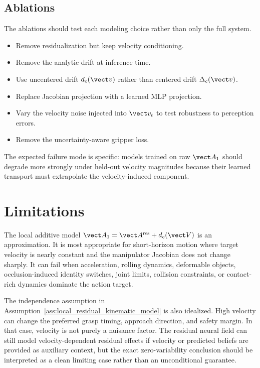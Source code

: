 \documentclass{article} %
\begin{document}
\subsection{Ablations}

The ablations should test each modeling choice rather than only the full system.
\begin{itemize}
    \item Remove residualization but keep velocity conditioning.
    \item Remove the analytic drift at inference time.
    \item Use uncentered drift $d_c(\vect v)$ rather than centered drift $\Delta_c(\vect v)$.
    \item Replace Jacobian projection with a learned MLP projection.
    \item Vary the velocity noise injected into $\vect v_t $ to test robustness to perception errors.
    \item Remove the uncertainty-aware gripper loss.
\end{itemize}
The expected failure mode is specific: models trained on raw $\vect A_1$ should degrade more strongly under held-out velocity magnitudes because their learned transport must extrapolate the velocity-induced component.

\section{Limitations}
\label{sec:limitations}

The local additive model $\vect A_1=\vect A^{\mathrm{res}}+d_c(\vect V)$ is an approximation. It is most appropriate for short-horizon motion where target velocity is nearly constant and the manipulator Jacobian does not change sharply. It can fail when acceleration, rolling dynamics, deformable objects, occlusion-induced identity switches, joint limits, collision constraints, or contact-rich dynamics dominate the action target.

The independence assumption in Assumption~\ref{ass:local_residual_kinematic_model} is also idealized. High velocity can change the preferred grasp timing, approach direction, and safety margin. In that case, velocity is not purely a nuisance factor. The residual neural field can still model velocity-dependent residual effects if velocity or predicted beliefs are provided as auxiliary context, but the exact zero-variability conclusion should be interpreted as a clean limiting case rather than an unconditional guarantee.
\end{document}
